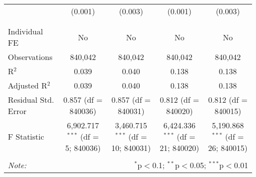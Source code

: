 \documentclass[
]{article}
\begin{document}
\begin{table}[!htbp]
{\begin{tabular}{@{\extracolsep{5pt}}lcccc}
  & (0.001) & (0.003) & (0.001) & (0.003) \\ 
  & & & & \\ 
\hline \\[-1.8ex] 
Individual FE & No & No & No & No \\ 
Observations & 840,042 & 840,042 & 840,042 & 840,042 \\ 
R$^{2}$ & 0.039 & 0.040 & 0.138 & 0.138 \\ 
Adjusted R$^{2}$ & 0.039 & 0.040 & 0.138 & 0.138 \\ 
Residual Std. Error & 0.857 (df = 840036) & 0.857 (df = 840031) & 0.812 (df = 840020) & 0.812 (df = 840015) \\ 
F Statistic & 6,902.717$^{***}$ (df = 5; 840036) & 3,460.715$^{***}$ (df = 10; 840031) & 6,424.336$^{***}$ (df = 21; 840020) & 5,190.868$^{***}$ (df = 26; 840015) \\ 
\hline 
\hline \\[-1.8ex] 
\textit{Note:}  & \multicolumn{4}{r}{$^{*}$p$<$0.1; $^{**}$p$<$0.05; $^{***}$p$<$0.01} \\ 
\end{tabular}
} 
\end{table} 
\newpage
\end{document}
